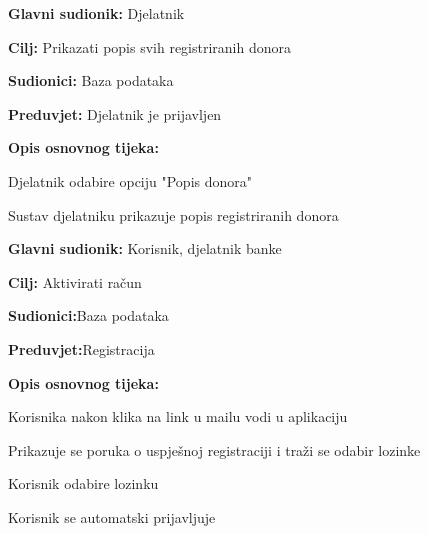 \documentclass[11pt]{book}
\begin{document}
\noindent {}
					\begin{packed_item}
	
						\item \textbf{Glavni sudionik: }Djelatnik
						\item \textbf{Cilj:} Prikazati popis svih registriranih donora
						\item \textbf{Sudionici:} Baza podataka
						\item \textbf{Preduvjet:} Djelatnik je prijavljen
						\item \textbf{Opis osnovnog tijeka:}
						
						\item[] \begin{packed_enum}
	
							\item Djelatnik odabire opciju "Popis donora"
							\item Sustav djelatniku prikazuje popis registriranih donora
						\end{packed_enum}

					\end{packed_item}


\noindent {}
\begin{packed_item}
	
	\item \textbf{Glavni sudionik: } {Korisnik, djelatnik banke}
	\item  \textbf{Cilj:} {Aktivirati račun}
	\item  \textbf{Sudionici:}{Baza podataka} 
	\item  \textbf{Preduvjet:}{Registracija}
	\item  \textbf{Opis osnovnog tijeka:}
	
	\item[] \begin{packed_enum}
		
		\item {Korisnika nakon klika na link u mailu vodi u aplikaciju}
		\item {Prikazuje se poruka o uspješnoj registraciji i traži se odabir lozinke} 
		\item {Korisnik odabire lozinku}
		\item {Korisnik se automatski prijavljuje}
		
	\end{packed_enum}
	
\end{packed_item}
\end{document}
